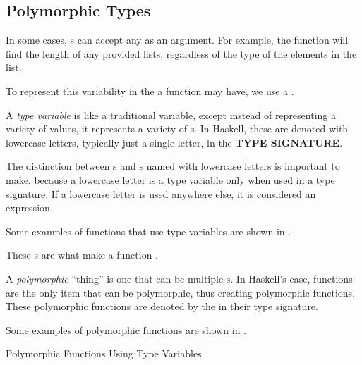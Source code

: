 \subsection{Polymorphic Types}\label{subsec:Polymorphic_Types}
In some cases, s can accept any  as an argument.
For example, the  function will find the length of any provided lists, regardless of the type of the elements in the list.

To represent this variability in the  a function may have, we use a .

\begin{definition}\label{def:Type_Variable}
  A \emph{type variable} is like a traditional variable, except instead of representing a variety of values, it represents a variety of s.
  In Haskell, these are denoted with lowercase letters, typically just a single letter, in the \textbf{TYPE SIGNATURE}.
  \begin{remark}
    The distinction between s and s named with lowercase letters is important to make, because a lowercase letter is a type variable only when used in a type signature.
    If a lowercase letter is used anywhere else, it is considered an expression.
  \end{remark}

  Some examples of functions that use type variables are shown in .
\end{definition}

These s are what make a function .

\begin{definition}[Polymorphic]\label{def:Polymorphic}
  A \emph{polymorphic} ``thing'' is one that can be multiple s.
  In Haskell's case, functions are the only item that can be polymorphic, thus creating polymorphic functions.
  These polymorphic functions are denoted by the  in their type signature.

  Some examples of polymorphic functions are shown in .
\end{definition}

\begin{listing}[h!tbp]
\caption{Polymorphic Functions Using Type Variables}
\label{lst:Polymorphic_Function_Examples}
\end{listing}

